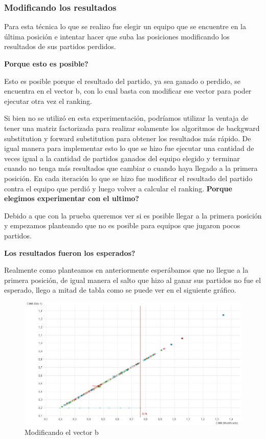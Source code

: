 \subsubsection{Modificando los resultados}

Para esta técnica lo que se realizo fue elegir un equipo que se encuentre en la última posición e intentar hacer que suba las posiciones modificando los resultados de sus partidos perdidos.

\textbf{Porque esto es posible?}

Esto es posible porque el resultado del partido, ya sea ganado o perdido, se encuentra en el vector b, con lo cual basta con modificar ese vector para poder ejecutar otra vez el ranking.

Si bien no se utilizó en esta experimentación, podríamos utilizar la ventaja de tener una matriz factorizada para realizar solamente los algoritmos de backgward substitution y forward substitution para obtener los resultados más rápido.
De igual manera para implementar esto lo que se hizo fue ejecutar una cantidad de veces igual a la cantidad de partidos ganados del equipo elegido y terminar cuando no tenga más resultados que cambiar o cuando haya llegado a la primera posición. En cada iteración lo que se hizo fue modificar el resultado del partido contra el equipo que perdió y luego volver a calcular el ranking.
\newpage
\textbf{Porque elegimos experimentar con el ultimo?}

Debido a que con la prueba queremos ver si es posible llegar a la primera posición y  empezamos planteando que no es posible para equipos que jugaron pocos partidos.

\textbf{Los resultados fueron los esperados?}

Realmente como planteamos en anteriormente esperábamos que no llegue a la primera posición, de igual manera el salto que hizo al ganar sus partidos no fue el esperado, llego a mitad de tabla como se puede ver en el siguiente gráfico.

\begin{figure}[H]
\centering
\includegraphics[width=1\textwidth]{IMG/modificandob.jpg}
\caption{Modificando el vector b}
\label{fig:Modificando partidos perdidos}
\end{figure}

